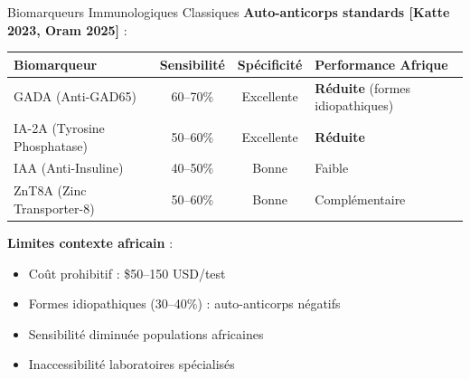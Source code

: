 \documentclass[11pt, aspectratio=169]{beamer}
\begin{document}
\begin{frame}{Biomarqueurs Immunologiques Classiques}
  \textbf{Auto-anticorps standards [Katte 2023, Oram 2025]} :
  
  \begin{table}[h]
    \small
    \centering
    \begin{tabularx}{0.95\textwidth}{|l|c|c|X|}
      \toprule
      \textbf{Biomarqueur} & \textbf{Sensibilité} & \textbf{Spécificité} & \textbf{Performance Afrique} \\
      \midrule
      GADA (Anti-GAD65) & 60--70\% & Excellente & \textbf{Réduite} (formes idiopathiques) \\
      IA-2A (Tyrosine Phosphatase) & 50--60\% & Excellente & \textbf{Réduite} \\
      IAA (Anti-Insuline) & 40--50\% & Bonne & Faible \\
      ZnT8A (Zinc Transporter-8) & 50--60\% & Bonne & Complémentaire \\
      \bottomrule
    \end{tabularx}
  \end{table}
  
  \vspace{0.8em}
  
  \textbf{\textcolor{accent1}{Limites contexte africain}} :
  \begin{itemize}
    \item Coût prohibitif : \$50--150 USD/test
    \item Formes idiopathiques (30--40\%) : auto-anticorps négatifs
    \item Sensibilité diminuée populations africaines
    \item Inaccessibilité laboratoires spécialisés
  \end{itemize}
\end{frame}
\end{document}
